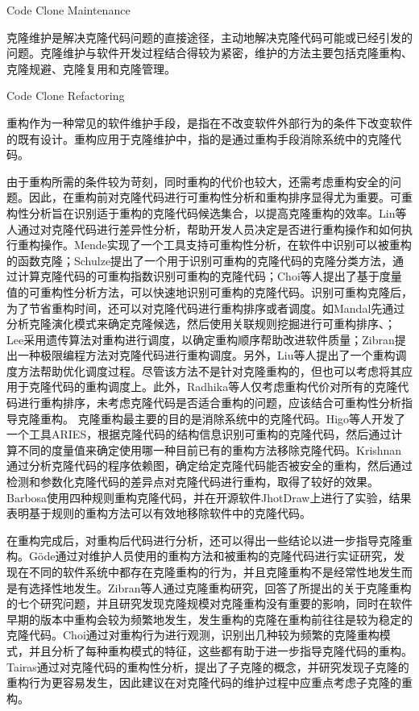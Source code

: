 {Code Clone Maintenance}

克隆维护是解决克隆代码问题的直接途径，主动地解决克隆代码可能或已经引发的问题。克隆维护与软件开发过程结合得较为紧密，维护的方法主要包括克隆重构、克隆规避、克隆复用和克隆管理。

{Code Clone Refactoring}

重构作为一种常见的软件维护手段，是指在不改变软件外部行为的条件下改变软件的既有设计\cite{kerievsky2006重构与模式}。重构应用于克隆维护中，指的是通过重构手段消除系统中的克隆代码。

由于重构所需的条件较为苛刻，同时重构的代价也较大，还需考虑重构安全的问题。因此，在重构前对克隆代码进行可重构性分析和重构排序显得尤为重要。可重构性分析旨在识别适于重构的克隆代码候选集合，以提高克隆重构的效率。Lin等人通过对克隆代码进行差异性分析，帮助开发人员决定是否进行重构操作和如何执行重构操作\cite{lin2014detecting}。Mende实现了一个工具支持可重构性分析，在软件中识别可以被重构的函数克隆\cite{mende2009evaluation}；Schulze提出了一个用于识别可重构的克隆代码的克隆分类方法，通过计算克隆代码的可重构指数识别可重构的克隆代码\cite{schulze2008towards}；Choi等人提出了基于度量值的可重构性分析方法，可以快速地识别可重构的克隆代码\cite{choi2011extracting}。识别可重构克隆后，为了节省重构时间，还可以对克隆代码进行重构排序或者调度。如Mandal先通过分析克隆演化模式来确定克隆候选，然后使用关联规则挖掘进行可重构排序、\cite{mandal2014automatic}；Lee采用遗传算法对重构进行调度，以确定重构顺序帮助改进软件质量\cite{lee2011automated}；Zibran提出一种极限编程方法对克隆代码进行重构调度\cite{zibran2011constraint}。另外，Liu等人提出了一个重构调度方法帮助优化调度过程\cite{liu2012schedule}。尽管该方法不是针对克隆重构的，但也可以考虑将其应用于克隆代码的重构调度上。此外，Radhika等人仅考虑重构代价对所有的克隆代码进行重构排序，未考虑克隆代码是否适合重构的问题\cite{venkatasubramanyam2013prioritizing}，应该结合可重构性分析指导克隆重构。
克隆重构最主要的目的是消除系统中的克隆代码。Higo等人开发了一个工具ARIES，根据克隆代码的结构信息识别可重构的克隆代码，然后通过计算不同的度量值来确定使用哪一种目前已有的重构方法移除克隆代码\cite{higo2008metric}。Krishnan通过分析克隆代码的程序依赖图，确定给定克隆代码能否被安全的重构，然后通过检测和参数化克隆代码的差异点对克隆代码进行重构，取得了较好的效果\cite{krishnan2014unification}。Barbosa使用四种规则重构克隆代码，并在开源软件JhotDraw上进行了实验，结果表明基于规则的重构方法可以有效地移除软件中的克隆代码\cite{barbosa2013removing}。

在重构完成后，对重构后代码进行分析，还可以得出一些结论以进一步指导克隆重构。G{\"o}de通过对维护人员使用的重构方法和被重构的克隆代码进行实证研究，发现在不同的软件系统中都存在克隆重构的行为，并且克隆重构不是经常性地发生而是有选择性地发生\cite{gode2010clone}。Zibran等人通过克隆重构研究，回答了所提出的关于克隆重构的七个研究问题，并且研究发现克隆规模对克隆重构没有重要的影响，同时在软件早期的版本中重构会较为频繁地发生，发生重构的克隆在重构前往往是较为稳定的克隆代码\cite{zibran2013evaluating}。Choi通过对重构行为进行观测，识别出几种较为频繁的克隆重构模式，并且分析了每种重构模式的特征，这些都有助于进一步指导克隆代码的重构\cite{eunjong2014investigation}。Tairas通过对克隆代码的重构性分析，提出了子克隆的概念，并研究发现子克隆的重构行为更容易发生，因此建议在对克隆代码的维护过程中应重点考虑子克隆的重构\cite{tairas2010sub}。

